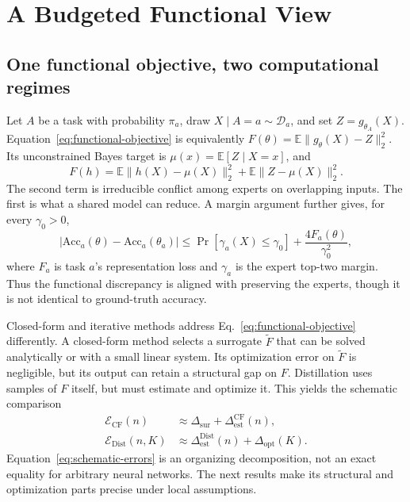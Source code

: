 \documentclass[letterpaper]{article} %
\theoremstyle{plain}
\theoremstyle{definition}
\begin{document}
\section{A Budgeted Functional View}
\label{sec:theory}

\subsection{One functional objective, two computational regimes}
\label{sec:common-objective}

Let $A$ be a task with probability $\pi_a$, draw $X\mid A=a\sim\mathcal D_a$, and set $Z=g_{\theta_A}(X)$.
Equation~\eqref{eq:functional-objective} is equivalently $F(\theta)=\mathbb E\|g_\theta(X)-Z\|_2^2$.
Its unconstrained Bayes target is $\mu(x)=\mathbb E[Z\mid X=x]$, and
\begin{equation}
F(h)=\mathbb E\|h(X)-\mu(X)\|_2^2
+\mathbb E\|Z-\mu(X)\|_2^2.
\label{eq:bayes-main}
\end{equation}
The second term is irreducible conflict among experts on overlapping inputs.
The first is what a shared model can reduce.
A margin argument further gives, for every $\gamma_0>0$,
\begin{equation}
|\mathrm{Acc}_a(\theta)-\mathrm{Acc}_a(\theta_a)|
\le
\Pr[\gamma_a(X)\le\gamma_0]
+\frac{4F_a(\theta)}{\gamma_0^2},
\label{eq:accuracy-main}
\end{equation}
where $F_a$ is task $a$'s representation loss and $\gamma_a$ is the expert top-two margin.
Thus the functional discrepancy is aligned with preserving the experts, though it is not identical to ground-truth accuracy.

Closed-form and iterative methods address Eq.~\eqref{eq:functional-objective} differently.
A closed-form method selects a surrogate $\widetilde F$ that can be solved analytically or with a small linear system.
Its optimization error on $\widetilde F$ is negligible, but its output can retain a structural gap on $F$.
Distillation uses samples of $F$ itself, but must estimate and optimize it.
This yields the schematic comparison
\begin{equation}
\begin{aligned}
\mathcal E_{\mathrm{CF}}(n)
&\approx \Delta_{\mathrm{sur}}+\Delta_{\mathrm{est}}^{\mathrm{CF}}(n),\\
\mathcal E_{\mathrm{Dist}}(n,K)
&\approx \Delta_{\mathrm{est}}^{\mathrm{Dist}}(n)
+\Delta_{\mathrm{opt}}(K).
\end{aligned}
\label{eq:schematic-errors}
\end{equation}
Equation~\eqref{eq:schematic-errors} is an organizing decomposition, not an exact equality for arbitrary neural networks.
The next results make its structural and optimization parts precise under local assumptions.
\end{document}
